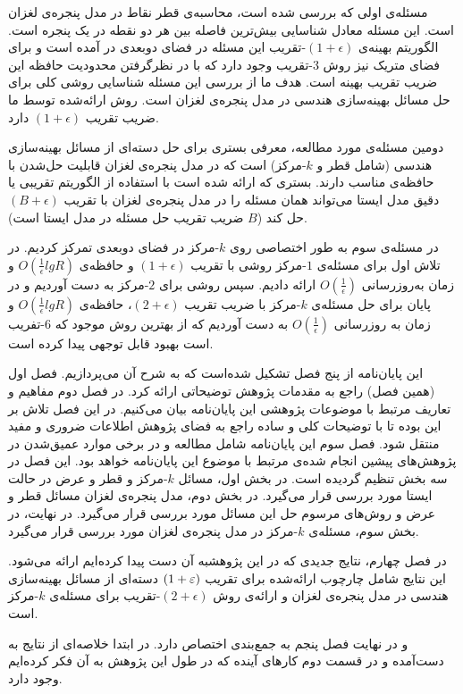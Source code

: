 مسئله‌ی اولی که بررسی شده است، محاسبه‌ی قطر نقاط در مدل پنجره‌ی لغزان است. این مسئله معادل شناسایی بیش‌ترین فاصله بین هر دو نقطه در یک پنجره است. الگوریتم بهینه‌ی $(1+\epsilon)$-تقریب این مسئله در فضای دوبعدی در   آمده است و برای فضای متریک نیز روش $3$-تقریب وجود دارد که با در نظرگرفتن محدودیت حافظه این ضریب تقریب بهینه است. هدف ما از بررسی این مسئله شناسایی روشی کلی برای حل مسائل بهینه‌سازی هندسی در مدل پنجره‌ی لغزان است. روش ارائه‌شده توسط ما ضریب تقریب $(1+\epsilon)$ دارد.

دومین مسئله‌ی مورد مطالعه، معرفی بستری برای حل دسته‌ای از مسائل بهینه‌سازی هندسی (شامل قطر و $k$-مرکز) است که در مدل پنجره‌ی لغزان قابلیت حل‌شدن با حافظه‌ی مناسب دارند. بستری که ارائه شده است با استفاده از الگوریتم تقریبی یا دقیق مدل ایستا می‌تواند همان مسئله را در مدل پنجره‌ی لغزان با تقریب $(B+\epsilon)$ حل کند ($B$ ضریب تقریب حل مسئله در مدل ایستا است). 

در مسئله‌ی سوم به طور اختصاصی روی $k$-مرکز در فضای دوبعدی تمرکز کردیم. در تلاش اول برای مسئله‌ی $1$-مرکز روشی با تقریب $(1+\epsilon)$ و حافظه‌ی $O(\frac{1}{\epsilon} lg R)$ و زمان به‌روز‌رسانی $O(\frac{1}{\epsilon})$ ارائه دادیم. سپس روشی برای $2$-مرکز به دست آوردیم و در پایان برای حل مسئله‌ی $k$-مرکز با ضریب تقریب $(2+\epsilon)$، حافظه‌ی  $O(\frac{1}{\epsilon} lg R)$ و زمان به روز‌رسانی $O(\frac{1}{\epsilon})$ به دست آوردیم که از بهترین روش موجود که $6$-تفریب است بهبود قابل توجهی پیدا کرده است.


این پایان‌نامه از پنج فصل تشکیل شده‌است که به شرح آن می‌پردازیم. فصل اول (همین فصل) راجع به مقدمات پژوهش توضیحاتی 
ارائه کرد. در فصل دوم مفاهیم و تعاریف مرتبط با موضوعات پژوهشی این پایان‌نامه بیان می‌کنیم. در این فصل تلاش بر این بوده تا با توضیحات کلی و ساده راجع به فضای پژوهش اطلاعات ضروری و مفید منتقل شود.
فصل سوم این پایان‌نامه شامل مطالعه و در برخی موارد عمیق‌شدن در پژوهش‌های پیشین انجام شده‌ی مرتبط با موضوع این پایان‌نامه خواهد بود.
این فصل در سه بخش تنظیم گردیده است.
در بخش اول، مسائل $k$-مرکز و قطر و عرض در حالت ایستا مورد بررسی قرار می‌گیرد.
در بخش دوم، مدل پنجره‌ی لغزان مسائل قطر و عرض و روش‌های مرسوم حل این مسائل مورد بررسی قرار می‌گیرد. در نهایت، در بخش سوم، مسئله‌ی $k$-مرکز در مدل پنجره‌ی لغزان مورد بررسی قرار می‌گیرد.

در فصل چهارم، نتایج جدیدی که در این پژوهشبه آن دست پیدا کرده‌ایم ارائه می‌شود.
این نتایج شامل چارچوب ارائه‌شده برای تقریب $(1+\varepsilon)$ دسته‌ای از مسائل بهینه‌سازی هندسی در مدل پنجره‌ی لغزان و ارائه‌ی روش $(2+\epsilon)$-تقریب برای مسئله‌ی $k$-مرکز  است.

و در نهایت فصل پنجم به جمع‌بندی اختصاص دارد. در ابتدا خلاصه‌ای از نتایج به دست‌آمده و در قسمت دوم کارهای آینده که در طول این پژوهش به آن فکر کرده‌ایم وجود دارد.
